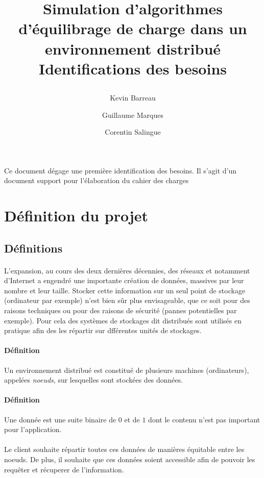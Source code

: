 \documentclass[12pt]{article}
\title{
 \begin{minipage}\linewidth
        \centering
        Simulation d'algorithmes d'équilibrage de charge dans un environnement distribué 
        \vskip3pt
        \large Identifications des besoins
    \end{minipage}
 }
\author{Kevin Barreau \and Guillaume Marques \and Corentin Salingue}
\begin{document}
\maketitle

\abstract
Ce document dégage une première identification des besoins.
Il s'agit d'un document support pour l'élaboration du cahier des charges

\newpage

\section{Définition du projet}

\subsection{Définitions}

\paragraph{}
L'expansion, au cours des deux dernières décennies, des réseaux et notamment d'Internet a engendré une importante création de données, massives par leur nombre et leur taille.
Stocker cette information sur un seul point de stockage (ordinateur par exemple) n'est bien sûr plus envisageable, que ce soit pour des raisons  techniques ou pour des raisons de sécurité (pannes potentielles par exemple).
Pour cela des systèmes de stockages dit distribués sont utilisés en pratique afin des les répartir sur dfférentes unités de stockages.

\paragraph{Définition} Un environnement distribué est constitué de plusieurs machines (ordinateurs), appelées \textit{noeuds}, sur lesquelles sont stockées des données.

\paragraph{Définition} Une donnée est une suite binaire de $0$ et de $1$ dont le contenu n'est pas important pour l'application.

\paragraph{} Le client souhaite répartir toutes ces données de manières équitable entre les noeuds. De plus, il souhaite que ces données soient accessible afin de pouvoir les requêter et récuperer de l'information.
\end{document}
